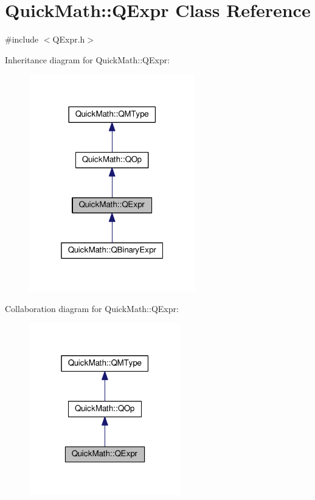 \hypertarget{classQuickMath_1_1QExpr}{}\section{Quick\+Math\+:\+:Q\+Expr Class Reference}
\label{classQuickMath_1_1QExpr}


{\ttfamily \#include $<$Q\+Expr.\+h$>$}



Inheritance diagram for Quick\+Math\+:\+:Q\+Expr\+:
\nopagebreak
\begin{figure}[H]
\begin{center}
\leavevmode
\includegraphics[width=205pt]{classQuickMath_1_1QExpr__inherit__graph}
\end{center}
\end{figure}


Collaboration diagram for Quick\+Math\+:\+:Q\+Expr\+:
\nopagebreak
\begin{figure}[H]
\begin{center}
\leavevmode
\includegraphics[width=187pt]{classQuickMath_1_1QExpr__coll__graph}
\end{center}
\end{figure}
